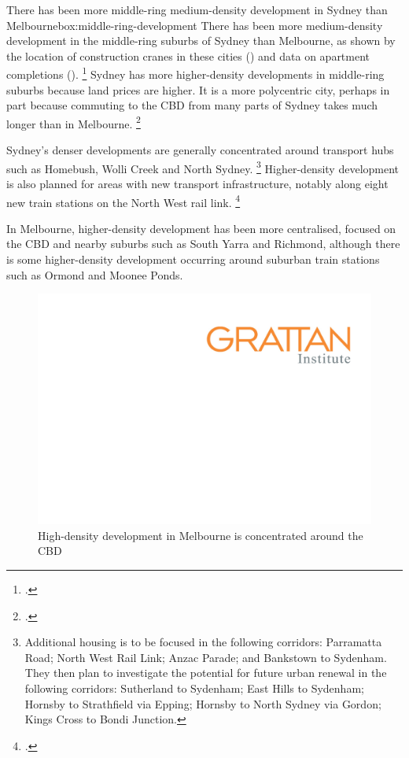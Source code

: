 \begin{bigbox}{There has been more middle-ring medium-density development in Sydney than Melbourne}{box:middle-ring-development}
\setlength{\parskip}{7.5pt}
There has been more medium-density development in the middle-ring suburbs of Sydney than Melbourne, as shown by the location of construction cranes in these cities () and data on apartment completions ().%
	\footcite{RLB2017CraneIndex}
Sydney has more higher-density developments in middle-ring suburbs because land prices are higher.
It is a more polycentric city, perhaps in part because commuting to the CBD from many parts of Sydney takes much longer than in Melbourne.%
	\footcite[][26]{KellyMaresHarrisonEtAl2013}

Sydney's denser developments are generally concentrated around transport hubs such as Homebush, Wolli Creek and North Sydney.%
	\footnote{\textcites{KentPhibbs2017Charts}[][8]{RLB2017CraneIndex}[][Action~2.2.2.]{NSWDPE2017ihaps}
    Additional housing is to be focused in the following corridors: Parramatta Road; North West Rail Link; Anzac Parade; and Bankstown to Sydenham.
    They then plan to investigate the potential for future urban renewal in the following corridors: Sutherland to Sydenham; East Hills to Sydenham; Hornsby to Strathfield via Epping; Hornsby to North Sydney via Gordon; Kings Cross to Bondi Junction.}
Higher-density development is also planned for areas with new transport infrastructure, notably along eight new train stations on the North West rail link.%
	\footcite[][10]{NSWNorthWestRail2013}

In Melbourne, higher-density development has been more centralised, focused on the CBD and nearby suburbs such as South Yarra and Richmond, although there is some higher-density development occurring around suburban train stations such as Ormond and Moonee Ponds.

\begin{figure}[H]
\caption{High-density development in Melbourne is concentrated around the CBD}\label{fig:gRLB-crane-maps}
\includegraphics[page=2]{atlas/RLB-cranes-maps.pdf}
\end{figure}


\end{bigbox}
